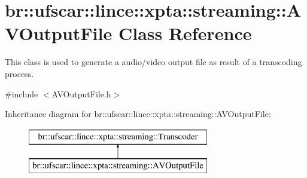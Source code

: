\hypertarget{classbr_1_1ufscar_1_1lince_1_1xpta_1_1streaming_1_1AVOutputFile}{
\section{br::ufscar::lince::xpta::streaming::AVOutputFile Class Reference}
\label{classbr_1_1ufscar_1_1lince_1_1xpta_1_1streaming_1_1AVOutputFile}
}


This class is used to generate a audio/video output file as result of a transcoding process.  




{\ttfamily \#include $<$AVOutputFile.h$>$}

Inheritance diagram for br::ufscar::lince::xpta::streaming::AVOutputFile:\begin{figure}[H]
\begin{center}
\leavevmode
\includegraphics[height=2cm]{classbr_1_1ufscar_1_1lince_1_1xpta_1_1streaming_1_1AVOutputFile}
\end{center}
\end{figure}
